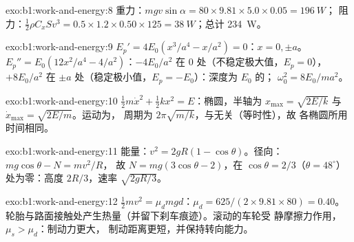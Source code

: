 \begin{solution}{exo:b1:work-and-energy:8}
重力：$mgv\sin\alpha = 80 \times 9.81 \times 5.0 \times 0.05 = \qty{196}{W}$；
阻力：$\tfrac12\rho C_xSv^3 = 0.5 \times 1.2 \times 0.50 \times 125 =
\qty{38}{W}$；总计 \qty{234}{W}。
\end{solution}

\begin{solution}{exo:b1:work-and-energy:9}
$E_p' = 4E_0(x^3/a^4 - x/a^2) = 0$：$x = 0, \pm a$。$E_p'' = E_0(12x^2/a^4 -
4/a^2)$：$-4E_0/a^2$ 在 $0$ 处（不稳定极大值，$E_p = 0$），$+8E_0/a^2$
在 $\pm a$ 处（稳定极小值，$E_p = -E_0$）：深度为 $E_0$ 的；
$\omega_0^2 = 8E_0/ma^2$。
\end{solution}

\begin{solution}{exo:b1:work-and-energy:10}
$\tfrac12 m\dot x^2 + \tfrac12 kx^2 = E$：椭圆，半轴为 $x_{\max}
= \sqrt{2E/k}$ 与 $\dot x_{\max} = \sqrt{2E/m}$。运动为，
周期为 $2\pi\sqrt{m/k}$，与无关（等时性），故
各椭圆所用时间相同。
\end{solution}

\begin{solution}{exo:b1:work-and-energy:11}
能量：$v^2 = 2gR(1 - \cos\theta)$。径向：$mg\cos\theta - N = mv^2/R$，
故 $N = mg(3\cos\theta - 2)$，在 $\cos\theta = 2/3$（$\theta =
48^\circ$）处为零：高度 $2R/3$，速率 $\sqrt{2gR/3}$。
\end{solution}

\begin{solution}{exo:b1:work-and-energy:12}
$\tfrac12 mv^2 = \mu_dmgd$：$\mu_d = 625/(2 \times 9.81 \times 80) = 0.40$。
轮胎与路面接触处产生热量（并留下刹车痕迹）。滚动的车轮受
静摩擦力作用，$\mu_s > \mu_d$：制动力更大，
制动距离更短，并保持转向能力。
\end{solution}

